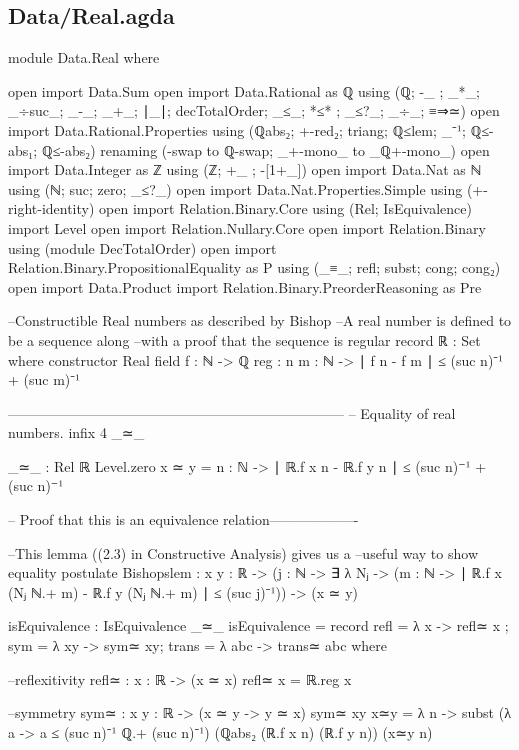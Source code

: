 \documentclass[11pt,a4paper]{article}
\begin{document}
\subsection{Data/Real.agda}
\begin{code}
module Data.Real where

open import Data.Sum
open import Data.Rational as ℚ using (ℚ; -_ ; _*_; _÷suc_; 
  _-_; _+_; ∣_∣;  decTotalOrder; _≤_; *≤* ; _≤?_; _÷_; ≡⇒≃)
open import Data.Rational.Properties using (ℚabs₂; 
  +-red₂; triang; ℚ≤lem; _⁻¹; ℚ≤-abs₁; ℚ≤-abs₂)
  renaming (-swap to ℚ-swap; _+-mono_ to _ℚ+-mono_)
open import Data.Integer as ℤ using (ℤ; +_ ; -[1+_])
open import Data.Nat as ℕ using (ℕ; suc; zero; _≤?_)
open import Data.Nat.Properties.Simple using (+-right-identity)
open import Relation.Binary.Core using (Rel; IsEquivalence)
import Level
open import Relation.Nullary.Core
open import Relation.Binary using (module DecTotalOrder)
open import Relation.Binary.PropositionalEquality as P using 
  (_≡_; refl; subst; cong; cong₂)
open import Data.Product
import Relation.Binary.PreorderReasoning as Pre

--Constructible Real numbers as described by Bishop
--A real number is defined to be a sequence along 
--with a proof that the sequence is regular
record ℝ : Set where
  constructor Real
  field
    f : ℕ -> ℚ
    reg : {n m : ℕ} -> ∣ f n - f m ∣ ≤ (suc n)⁻¹ + (suc m)⁻¹

------------------------------------------------------------------------
-- Equality of real numbers.
infix 4 _≃_

_≃_ : Rel ℝ Level.zero
x ≃ y =  {n : ℕ} -> ∣ ℝ.f x n - ℝ.f y n ∣ ≤ (suc n)⁻¹ + (suc n)⁻¹

-- Proof that this is an equivalence relation-------------------

--This lemma ((2.3) in Constructive Analysis) gives us a
--useful way to show equality
postulate Bishopslem : {x y : ℝ} -> 
           ({j : ℕ} -> ∃ λ Nⱼ -> ({m : ℕ} -> 
           ∣ ℝ.f x (Nⱼ ℕ.+ m) - ℝ.f y (Nⱼ ℕ.+ m) ∣ ≤ (suc j)⁻¹)) 
           -> (x ≃ y)

isEquivalence : IsEquivalence _≃_
isEquivalence = record {
  refl = λ {x} -> refl≃ {x} ;
  sym = λ {x}{y} -> sym≃ {x}{y};
  trans = λ {a}{b}{c} -> trans≃ {a}{b}{c}
  }
  where

  --reflexitivity
  refl≃ : {x : ℝ} -> (x ≃ x)
  refl≃ {x} = ℝ.reg x

  --symmetry
  sym≃ : {x y : ℝ} -> (x ≃ y -> y ≃ x)
  sym≃ {x}{y} x≃y = λ {n} -> 
    subst (λ a -> a ≤ (suc n)⁻¹ ℚ.+ (suc n)⁻¹) 
    (ℚabs₂ (ℝ.f x n) (ℝ.f y n)) (x≃y {n})


\end{code}
\end{document}
